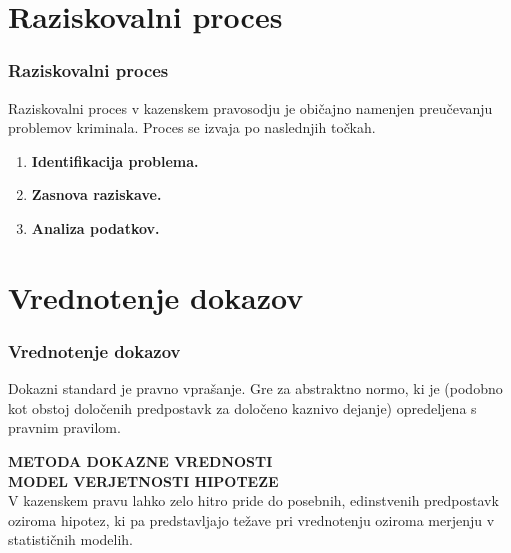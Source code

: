 \documentclass{beamer}
\begin{document}
\section{Raziskovalni proces}
\begin{frame}
    \frametitle{Raziskovalni proces}
    Raziskovalni proces v kazenskem pravosodju je običajno namenjen preučevanju problemov kriminala. Proces se izvaja po naslednjih točkah.\\ \vspace{2mm}
    \begin{enumerate}
        \item \textbf{Identifikacija problema.\\} 
        \item \textbf{Zasnova raziskave.\\} 
        \item \textbf{Analiza podatkov.\\}
    \end{enumerate}
\end{frame}

\section{Vrednotenje dokazov}
\begin{frame}
    \frametitle{Vrednotenje dokazov}
    \begin{block}{Dokazni standard}
        je pravno vprašanje. Gre za abstraktno normo, ki je (podobno kot obstoj določenih predpostavk za 
        določeno kaznivo dejanje) opredeljena s pravnim pravilom.
    \end{block}\vspace{3mm}
    \textbf{METODA DOKAZNE VREDNOSTI}\\
    \textbf{MODEL VERJETNOSTI HIPOTEZE}\\ \vspace{3mm}
    V kazenskem pravu lahko zelo hitro pride do posebnih, edinstvenih predpostavk oziroma hipotez, ki pa predstavljajo težave pri vrednotenju oziroma merjenju v statističnih modelih. 
\end{frame}
\end{document}
